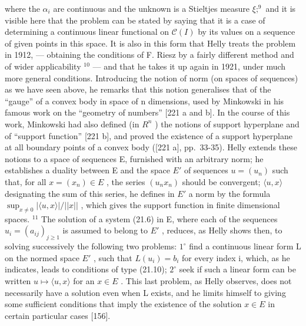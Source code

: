 where the \(\alpha_{i}\) are continuous and the unknown is a Stieltjes measure \(\xi;^{9}\) and it is visible here that the problem can be stated by saying that it is a case of determining a continuous linear functional on \(\mathcal{C}(I)\) by its values on a sequence of given points in this space. It is also in this form that Helly treats the problem in 1912, --- obtaining the conditions of F. Riesz by a fairly different method and of wider applicability \(^{10}\) --- and that he takes it up again in 1921, under much more general conditions. Introducing the notion of norm (on spaces of sequences) as we have seen above, he remarks that this notion generalises that of the ``gauge'' of a convex body in space of n dimensions, used by Minkowski in his famous work on the ``geometry of numbers'' {[}221 a and b{]}. In the course of this work, Minkowski had also defined (in \(R^{n}\) ) the notions of support hyperplane and of ``support function'' {[}221 b{]}, and proved the existence of a support hyperplane at all boundary points of a convex body ({[}221 a{]}, pp.~33-35). Helly extends these notions to a space of sequences E, furnished with an arbitrary norm; he establishes a duality between E and the space \(E'\) of sequences \(u = (u_n)\) such that, for all \(x = (x_n) \in E\) , the series \((u_n x_n)\) should be convergent; \(\langle u, x \rangle\) designating the sum of this series, he defines in \(E'\) a norm by the formula \(\sup_{x \neq 0} |\langle u, x \rangle| / ||x||\) , which gives the support function in finite dimensional spaces. \(^{11}\) The solution of a system (21.6) in E, where each of the sequences \(u_i = (a_{ij})_{j \geq 1}\) is assumed to belong to \(E'\) , reduces, as Helly shows then, to solving successively the following two problems: \(1^\circ\) find a continuous linear form L on the normed space \(E'\) , such that \(L(u_i) = b_i\) for every index i, which, as he indicates, leads to conditions of type (21.10); \(2^\circ\) seek if such a linear form can be written \(u \mapsto \langle u, x \rangle\) for an \(x \in E\) . This last problem, as Helly observes, does not necessarily have a solution even when L exists, and he limits himself to giving some sufficient conditions that imply the existence of the solution \(x \in E\) in certain particular cases {[}156{]}.

